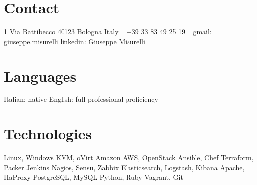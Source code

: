 \documentclass[]{friggeri-cv} %
\begin{document}


\begin{aside} %
\section{Contact}
1 Via Battibecco
40123 Bologna
Italy
~
+39 33 83 49 25 19
~
\href{mailto:giuseppe.misurelli@gmail.com}{gmail: giuseppe.misurelli}
\href{https://it.linkedin.com/pub/giuseppe-misurelli/2/820/537}{linkedin: Giuseppe Misurelli}
\section{Languages}
Italian: native
English: full professional proficiency
\section{Technologies}
Linux, Windows
KVM, oVirt
Amazon AWS, OpenStack
Ansible, Chef
Terraform, Packer
Jenkins
Nagios, Sensu, Zabbix
Elasticsearch, Logstash, Kibana
Apache, HaProxy
PostgreSQL, MySQL
Python, Ruby
Vagrant, Git
\end{aside}

\end{document}

